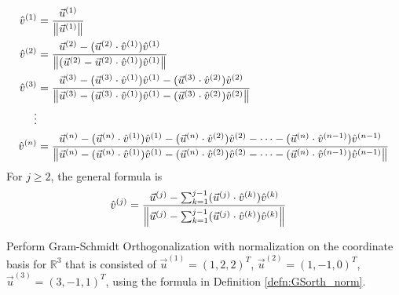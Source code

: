 \begin{defn}
\label{defn:GSorth_norm}
\begin{align*}
\hat{v}^{(1)} &= \frac{\vec{u}^{(1)}}{\norm{\vec{u}^{(1)}}} \\
\hat{v}^{(2)} &= \frac{\vec{u}^{(2)} - (\vec{u}^{(2)} \cdot \hat{v}^{(1)})\hat{v}^{(1)}}{\norm{(\vec{u}^{(2)} - \vec{u}^{(2)} \cdot \hat{v}^{(1)})\hat{v}^{(1)}}} \\
\hat{v}^{(3)} &= \frac{\vec{u}^{(3)} - (\vec{u}^{(3)} \cdot \hat{v}^{(1)})\hat{v}^{(1)} - (\vec{u}^{(3)} \cdot \hat{v}^{(2)})\hat{v}^{(2)}}{\norm{\vec{u}^{(3)} - (\vec{u}^{(3)} \cdot \hat{v}^{(1)})\hat{v}^{(1)} - (\vec{u}^{(3)} \cdot \hat{v}^{(2)})\hat{v}^{(2)}}} \\
\vdots \\
\hat{v}^{(n)} &= \frac{\vec{u}^{(n)} - (\vec{u}^{(n)} \cdot \hat{v}^{(1)})\hat{v}^{(1)} - (\vec{u}^{(n)} \cdot \hat{v}^{(2)})\hat{v}^{(2)} - \cdots - (\vec{u}^{(n)} \cdot \hat{v}^{(n-1)})\hat{v}^{(n-1)}}{\norm{\vec{u}^{(n)} - (\vec{u}^{(n)} \cdot \hat{v}^{(1)})\hat{v}^{(1)} - (\vec{u}^{(n)} \cdot \hat{v}^{(2)})\hat{v}^{(2)} - \cdots - (\vec{u}^{(n)} \cdot \hat{v}^{(n-1)})\hat{v}^{(n-1)}}} 
\end{align*}
For $j \geq 2$, the general formula is
\begin{align*}
\hat{v}^{(j)} &= \frac{\vec{u}^{(j)} - \sum_{k=1}^{j-1}(\vec{u}^{(j)} \cdot \hat{v}^{(k)})\hat{v}^{(k)}}{\norm{\vec{u}^{(j)} - \sum_{k=1}^{j-1}(\vec{u}^{(j)} \cdot \hat{v}^{(k)})\hat{v}^{(k)}}}
\end{align*}
\end{defn}
\begin{exmp}
\label{exmp:GS_ex}
Perform Gram-Schmidt Orthogonalization with normalization on the coordinate basis for $\mathbb{R}^3$ that is consisted of $\vec{u}^{(1)} = (1,2,2)^T$, $\vec{u}^{(2)} = (1,-1,0)^T$, $\vec{u}^{(3)} = (3,-1,1)^T$, using the formula in Definition \ref{defn:GSorth_norm}.
\end{exmp}

